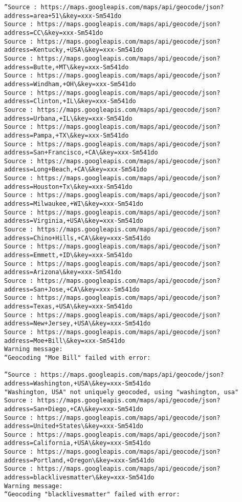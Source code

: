 \documentclass[11pt]{article}
\begin{document}
\begin{Verbatim}[commandchars=\\\{\}]
”Source : https://maps.googleapis.com/maps/api/geocode/json?address=area+51\&key=xxx-Sm541do
Source : https://maps.googleapis.com/maps/api/geocode/json?address=CC\&key=xxx-Sm541do
Source : https://maps.googleapis.com/maps/api/geocode/json?address=Kentucky,+USA\&key=xxx-Sm541do
Source : https://maps.googleapis.com/maps/api/geocode/json?address=Butte,+MT\&key=xxx-Sm541do
Source : https://maps.googleapis.com/maps/api/geocode/json?address=Windham,+OH\&key=xxx-Sm541do
Source : https://maps.googleapis.com/maps/api/geocode/json?address=Clinton,+IL\&key=xxx-Sm541do
Source : https://maps.googleapis.com/maps/api/geocode/json?address=Urbana,+IL\&key=xxx-Sm541do
Source : https://maps.googleapis.com/maps/api/geocode/json?address=Pampa,+TX\&key=xxx-Sm541do
Source : https://maps.googleapis.com/maps/api/geocode/json?address=San+Francisco,+CA\&key=xxx-Sm541do
Source : https://maps.googleapis.com/maps/api/geocode/json?address=Long+Beach,+CA\&key=xxx-Sm541do
Source : https://maps.googleapis.com/maps/api/geocode/json?address=Houston+Tx\&key=xxx-Sm541do
Source : https://maps.googleapis.com/maps/api/geocode/json?address=Milwaukee,+WI\&key=xxx-Sm541do
Source : https://maps.googleapis.com/maps/api/geocode/json?address=Virginia,+USA\&key=xxx-Sm541do
Source : https://maps.googleapis.com/maps/api/geocode/json?address=Chino+Hills,+CA\&key=xxx-Sm541do
Source : https://maps.googleapis.com/maps/api/geocode/json?address=Emmett,+ID\&key=xxx-Sm541do
Source : https://maps.googleapis.com/maps/api/geocode/json?address=Arizona\&key=xxx-Sm541do
Source : https://maps.googleapis.com/maps/api/geocode/json?address=San+Jose,+CA\&key=xxx-Sm541do
Source : https://maps.googleapis.com/maps/api/geocode/json?address=Texas,+USA\&key=xxx-Sm541do
Source : https://maps.googleapis.com/maps/api/geocode/json?address=New+Jersey,+USA\&key=xxx-Sm541do
Source : https://maps.googleapis.com/maps/api/geocode/json?address=Moe+Bill\&key=xxx-Sm541do
Warning message:
“Geocoding "Moe Bill" failed with error:

”Source : https://maps.googleapis.com/maps/api/geocode/json?address=Washington,+USA\&key=xxx-Sm541do
"Washington, USA" not uniquely geocoded, using "washington, usa"
Source : https://maps.googleapis.com/maps/api/geocode/json?address=San+Diego,+CA\&key=xxx-Sm541do
Source : https://maps.googleapis.com/maps/api/geocode/json?address=United+States\&key=xxx-Sm541do
Source : https://maps.googleapis.com/maps/api/geocode/json?address=California,+USA\&key=xxx-Sm541do
Source : https://maps.googleapis.com/maps/api/geocode/json?address=Portland,+Oregon\&key=xxx-Sm541do
Source : https://maps.googleapis.com/maps/api/geocode/json?address=blacklivesmatter\&key=xxx-Sm541do
Warning message:
“Geocoding "blacklivesmatter" failed with error:


\end{Verbatim}
\end{document}
